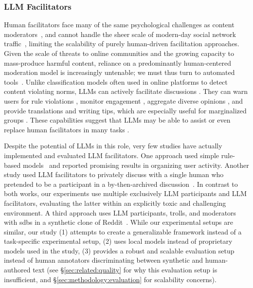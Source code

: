 \subsubsection{LLM Facilitators}
Human facilitators face many of the same psychological challenges as content moderators~\cite{schopke2024volunteer}, and cannot handle the sheer scale of modern-day social network traffic~\cite{schaffner_community_guidelines}, limiting the scalability of purely human-driven facilitation approaches. Given the scale of threats to online communities and the growing capacity to mass-produce harmful content, reliance on a predominantly human-centered moderation model is increasingly untenable; we must thus turn to automated tools~\cite{small-polis-llm, korre2025evaluation}. Unlike classification models often used in online platforms to detect content violating norms, LLMs can actively facilitate discussions \cite{korre2025evaluation}. 
They can warn users for rule violations \cite{Kumar_AbuHashem_Durumeric_2024}, monitor engagement \cite{schroeder-etal-2024-fora}, aggregate diverse opinions \cite{small-polis-llm}, and provide translations and writing tips, which are especially useful for marginalized groups \cite{Tsai2024Generative}. These capabilities suggest that LLMs may be able to assist or even replace human facilitators in many tasks \cite{small-polis-llm,korre2025evaluation}.

Despite the potential of LLMs in this role, very few studies have actually implemented and evaluated LLM facilitators. One approach used simple rule-based models~\cite{kim_et_al_chatbot} and reported promising results in organizing user activity. Another study used LLM facilitators to privately discuss with a single human who pretended to be a participant in a by-then-archived discussion~\cite{cho-etal-2024-language}. In contrast to both works, our experiments use multiple exclusively LLM participants and LLM facilitators, evaluating the latter within an explicitly toxic and challenging environment. A third approach uses LLM participants, trolls, and moderators with \acp{sdb} in a synthetic clone of Reddit~\cite{park_simulacra}. While our experimental setups are similar, our study (1) attempts to create a generalizable framework instead of a task-specific experimental setup, (2) uses local models instead of proprietary models used in the study, (3) provides a robust and scalable evaluation setup instead of human annotators discriminating between synthetic and human-authored text (see \S\ref{sec:related:quality} for why this evaluation setup is insufficient, and \S\ref{sec:methodology:evaluation} for scalability concerns).